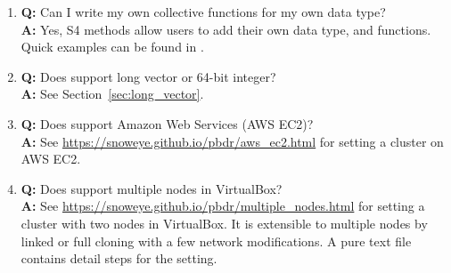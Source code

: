 \begin{enumerate}
      Originally,  only considers batch execution and
      aims for programming with big data that do not fit on desktop
      platforms. We think that interaction with big data on a big
      machine is better handled with a client/server interface, where
      the server runs SPMD codes on big data and the client operates
      with reduced data representations.

      If you really need an interactive mode, such as for debugging,
      you can utilize  scripts inside
      .  mainly focuses on Manager/Workers
      computing environments, but can run SPMD codes on workers only
      with a few adjustments. See the ``Programming with Big Data in R''
      website for details at \url{https://pbdr.org/}.

      Note that  uses communicators different from
      .  Be sure to free the memory correctly for both
      packages before quitting. 
      can free the memory allocated by , but does not
      terminate MPI before calling  of .

\item {\bf\color{blue} Q:}
      Can I write my own collective functions for my own data type? \\
      {\bf\color{blue} A:}
      Yes, S4 methods allow users to add their own data type, and functions.
      Quick examples can be found in .

\item {\bf\color{blue} Q:}
      Does  support long vector or 64-bit integer? \\
      {\bf\color{blue} A:}
      See Section~\ref{sec:long_vector}.

\item {\bf\color{blue} Q:}
      Does  support Amazon Web Services (AWS EC2)? \\
      {\bf\color{blue} A:}
      See \url{https://snoweye.github.io/pbdr/aws_ec2.html}
      for setting a cluster on AWS EC2.

\item {\bf\color{blue} Q:}
      Does  support multiple nodes in VirtualBox? \\
      {\bf\color{blue} A:}
      See \url{https://snoweye.github.io/pbdr/multiple_nodes.html}
      for setting a cluster with two nodes in VirtualBox. It is extensible to
      multiple nodes by linked or full cloning with a few network modifications.
      A pure text file  contains detail steps for the
      setting.


\end{enumerate}
